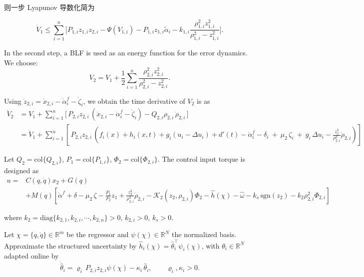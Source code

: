 \documentclass[pdflatex,sn-mathphys-num]{sn-jnl}%
\theoremstyle{thmstyleone}%
\theoremstyle{thmstyletwo}%
\theoremstyle{thmstylethree}%
\begin{document}
则一步 Lyapunov 导数化简为

$$
\dot V_1
\le \sum_{i=1}^n \Big[ P_{1,i}z_{1,i} z_{2,i}
-\Psi(V_{1,i})-P_{1,i}z_{1,i}\tilde\alpha_i- k_{1,i}\frac{\rho_{1,i}^2 z_{1,i}^2}{\rho_{1,i}^2-z_{1,i}^2} 
\Big].
$$


In the second step, a BLF is used as an energy function for the error dynamics. We choose:
\begin{equation}\label{eq:25}
	V_2= V_1+\frac{1}{2}\sum_{i=1}^{n} \frac{\rho_{2,i}^2 z_{2,i}^2}{\rho_{2,i}^2-z_{2,i}^2}. 
\end{equation}


Using $\dot z_{2,i}=\dot x_{2,i}-\dot\alpha_i^{f}-\dot\zeta_i$, we obtain the time derivative of $V_2$ is as
\begin{equation}
	\begin{aligned}
		\dot V_2& = V_1+\sum_{i=1}^n \Big[\,P_{2,i}z_{2,i}\,(\dot x_{2,i}-\dot\alpha_i^{f}-\dot\zeta_i)-Q_{2,i}\rho_{2,i}\,\dot\rho_{2,i}\,\Big]\\
		&
		 = \dot V_1+\sum_{i=1}^n \left[\,P_{2,i}z_{2,i}\,\left(f_i(x)+h_i(x,t)+g_i(u_i-\Delta u_i)+d'(t)-\dot\alpha_i^{f}-\delta_i\ +\ \mu_2\,\zeta_i\ +\ g_i\,\Delta u_i-\tfrac{z_{2}^{3}}{\rho_{2,i}^{3}}\dot\rho_{2,i} \right)\right]
	\end{aligned}
\end{equation}

Let $Q_2=\mathrm{col}\{Q_{2,i}\}$,
$P_1=\mathrm{col}\{P_{1,i}\}$,
$\Phi_2=\mathrm{col}\{\Phi_{2,i}\}$. The control input torque is designed as
\begin{equation}\label{eq:tau-cmd}
\begin{aligned}
u =&C(q,\dot{q})x_2 + G(q)\\
&+M(q)\left[\dot\alpha^{f}+\delta -\mu_2\,\zeta-\frac{P_1}{P_2}z_1+\tfrac{z_{2}^{3}}{\rho_{2,i}^{3}}\dot\rho_{2,i}-\mathcal{K}_{2}(z_{2},\rho_{2,i}) \Phi_{2}
-\hat{h}(\chi)
-\hat \omega
-k_s\,\mathrm{sgn}(z_{2})-k_{2}\rho_{2,i}^2 \Phi_{2,i}\right]
\end{aligned}
\end{equation}


where $k_2=\mathrm{diag}\{k_{2,1},k_{2,i},\cdots,k_{2,n}\}>0$, $k_{2,i}>0$, $k_s>0$.

Let $\chi=\{q,\dot{q}\}\in\mathbb{R}^m$ be the regressor and $\psi(\chi)\in\mathbb{R}^{N}$ the normalized basis. Approximate the structured uncertainty by 
\( \hat h_i(\chi)=\hat \theta_i^\top \psi_i(\chi)\),
with $\theta_i\in\mathbb{R}^{N}  $ adapted online by
\begin{equation}\label{eq:theta-law}
\dot{\hat{\theta}}_i = \varrho_i\,P_{2,i} z_{2,i}\psi(\chi) - \kappa_i\,\hat{\theta}_i,\qquad
\varrho_i,\kappa_i>0.
\end{equation}
\end{document}

